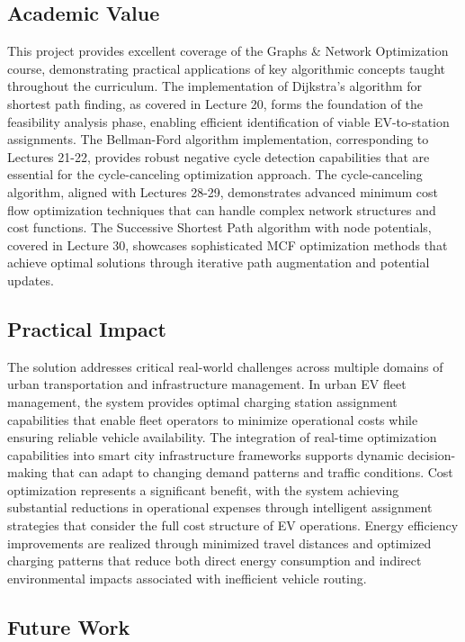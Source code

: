 \documentclass[12pt,a4paper]{article}
\begin{document}
\subsection{Academic Value}

This project provides excellent coverage of the Graphs \& Network Optimization course, demonstrating practical applications of key algorithmic concepts taught throughout the curriculum. The implementation of Dijkstra's algorithm for shortest path finding, as covered in Lecture 20, forms the foundation of the feasibility analysis phase, enabling efficient identification of viable EV-to-station assignments. The Bellman-Ford algorithm implementation, corresponding to Lectures 21-22, provides robust negative cycle detection capabilities that are essential for the cycle-canceling optimization approach. The cycle-canceling algorithm, aligned with Lectures 28-29, demonstrates advanced minimum cost flow optimization techniques that can handle complex network structures and cost functions. The Successive Shortest Path algorithm with node potentials, covered in Lecture 30, showcases sophisticated MCF optimization methods that achieve optimal solutions through iterative path augmentation and potential updates.

\subsection{Practical Impact}

The solution addresses critical real-world challenges across multiple domains of urban transportation and infrastructure management. In urban EV fleet management, the system provides optimal charging station assignment capabilities that enable fleet operators to minimize operational costs while ensuring reliable vehicle availability. The integration of real-time optimization capabilities into smart city infrastructure frameworks supports dynamic decision-making that can adapt to changing demand patterns and traffic conditions. Cost optimization represents a significant benefit, with the system achieving substantial reductions in operational expenses through intelligent assignment strategies that consider the full cost structure of EV operations. Energy efficiency improvements are realized through minimized travel distances and optimized charging patterns that reduce both direct energy consumption and indirect environmental impacts associated with inefficient vehicle routing.

\subsection{Future Work}
\end{document}
